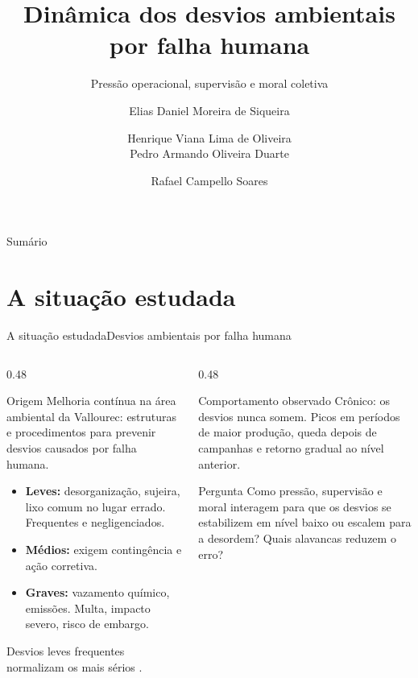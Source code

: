 \documentclass[aspectratio=169, 10pt]{beamer}
\title[Pensamento Sistêmico em Engenharia]{Dinâmica dos desvios ambientais por falha humana}
\subtitle{Pressão operacional, supervisão e moral coletiva}
\author[Grupo 3]{%
  Elias Daniel Moreira de Siqueira \and Henrique Viana Lima de Oliveira\\
  Pedro Armando Oliveira Duarte \and Rafael Campello Soares}
\institute[UFMG]{ELE637 -- Pensamento Sistêmico em Engenharia\\
  Escola de Engenharia -- Universidade Federal de Minas Gerais}
\date[Desvios ambientais]{}
\begin{document}
\begin{frame}[plain]
  \titlepage
\end{frame}

\begin{frame}{Sumário}
  \tableofcontents
\end{frame}

\section{A situação estudada}

\begin{frame}{A situação estudada}{Desvios ambientais por falha humana}
  \begin{columns}[T]
    \begin{column}{0.48\textwidth}
      \begin{block}{Origem}
        Melhoria contínua na área ambiental da Vallourec: estruturas e procedimentos para prevenir desvios causados por falha humana.
      \end{block}
      \begin{itemize}
        \item \textbf{Leves:} desorganização, sujeira, lixo comum no lugar errado. Frequentes e negligenciados.
        \item \textbf{Médios:} exigem contingência e ação corretiva.
        \item \textbf{Graves:} vazamento químico, emissões. Multa, impacto severo, risco de embargo.
      \end{itemize}
      \small Desvios leves frequentes normalizam os mais sérios \citep{banja2010}.
    \end{column}
    \begin{column}{0.48\textwidth}
      \begin{exampleblock}{Comportamento observado}
        Crônico: os desvios nunca somem. Picos em períodos de maior produção, queda depois de campanhas e retorno gradual ao nível anterior.
      \end{exampleblock}
      \begin{alertblock}{Pergunta}
        Como pressão, supervisão e moral interagem para que os desvios se estabilizem em nível baixo ou escalem para a desordem? Quais alavancas reduzem o erro?
      \end{alertblock}
    \end{column}
  \end{columns}
\end{frame}
\end{document}
